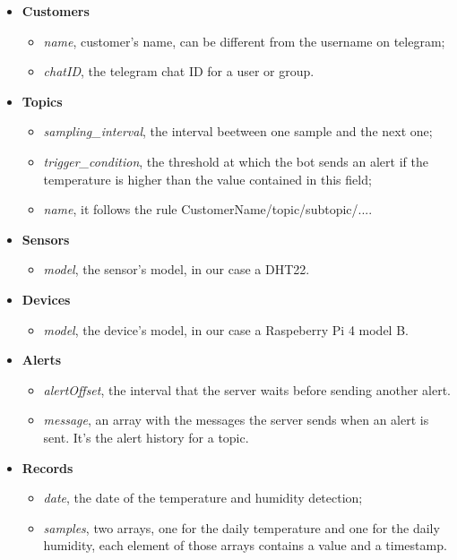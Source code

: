 \begin{itemize}\label{list:collections}
    \item \textbf{Customers}
    \begin{itemize}
        \item \textit{name}, customer's name, can be different from the username on telegram;
        \item \textit{chatID}, the telegram chat ID for a user or group.
    \end{itemize}
    \item \textbf{Topics}
    \begin{itemize}
        \item \textit{sampling\_interval}, the interval beetween one sample and the next one;
        \item \textit{trigger\_condition}, the threshold at which the bot sends an alert if the temperature is higher than the value contained in this field;
        \item \textit{name}, it follows the rule CustomerName/topic/subtopic/....
    \end{itemize}
    \item \textbf{Sensors}
    \begin{itemize}
        \item \textit{model}, the sensor's model, in our case a DHT22.
    \end{itemize}
    \item \textbf{Devices}
    \begin{itemize}
        \item \textit{model}, the device's model, in our case a Raspeberry Pi 4 model B.
    \end{itemize}
    \item \textbf{Alerts}
    \begin{itemize}
        \item \textit{alertOffset}, the interval that the server waits before sending another alert.
        \item \textit{message}, an array with the messages the server sends when an alert is sent. It's the alert history for a topic.
    \end{itemize}
    \item \textbf{Records}
    \begin{itemize}
        \item \textit{date}, the date of the temperature and humidity detection;
        \item \textit{samples}, two arrays, one for the daily temperature and one for the daily humidity, each element of those arrays contains a value and a timestamp.
    \end{itemize}
\end{itemize}
\vspace{3mm}

